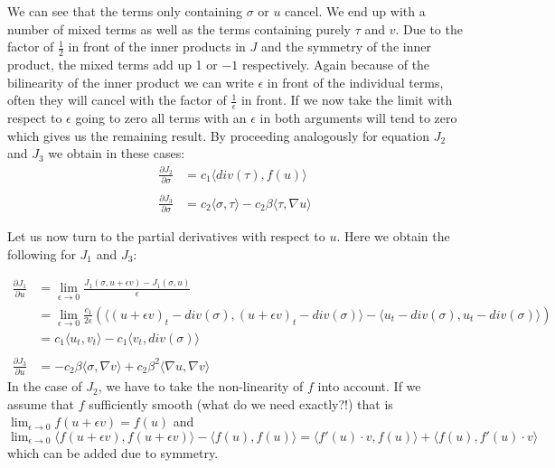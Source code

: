 \documentclass[../draft_1.tex]{subfiles}
\begin{document}
We can see that the terms only containing $\sigma$ or $u$ cancel. We end up with a number of mixed terms as well as the terms containing purely $\tau$ and $v$. Due to the factor of $\frac{1}{2}$ in front of the inner products in $J$ and the symmetry of the inner product, the mixed terms add up 1 or $-1$ respectively. Again because of the bilinearity of the inner product we can write $\epsilon$ in front of the individual terms, often they will cancel with the factor of $\frac{1}{\epsilon}$ in front. If we now take the limit with respect to $\epsilon$ going to zero all terms with an $\epsilon$ in both arguments will tend to zero which gives us the remaining result. By proceeding analogously for equation $J_2$ and $J_3$ we obtain in these cases: 
\begin{equation}
\begin{aligned}
\frac{\partial J_2}{\partial \sigma} &= c_1 \langle div(\tau), f(u) \rangle \\
\\
\frac{\partial J_3}{\partial \sigma} &= c_2 \langle \sigma, \tau \rangle - c_2 \beta \langle \tau, \nabla u \rangle
\end{aligned}
\end{equation}

Let us now turn to the partial derivatives with respect to $u$. Here we obtain the following for $J_1$ and $J_3$:

\begin{equation}
\begin{aligned}
\frac{\partial J_1}{\partial u} &=   \lim_{\epsilon \rightarrow 0} \frac{J_1(\sigma, u + \epsilon v) - J_1(\sigma, u)}{\epsilon}  \\
&= \lim_{\epsilon \rightarrow 0} \frac{c_1}{2 \epsilon} (\langle (u + \epsilon v)_t - div(\sigma), (u + \epsilon v)_t - div(\sigma) \rangle - \langle u_t - div(\sigma), u_t - div(\sigma) \rangle) \\
&= c_1 \langle u_t, v_t \rangle - c_1 \langle v_t, div(\sigma) \rangle \\
\\
\frac{\partial J_3}{\partial u} &= - c_2 \beta \langle \sigma, \nabla v \rangle + c_2 \beta^2 \langle \nabla u, \nabla v \rangle
\end{aligned}
\end{equation}
In the case of $J_2$, we have to take the non-linearity of $f$ into account. If we assume that $f$ sufficiently smooth (what do we need exactly?!) that is $  \lim_{\epsilon \rightarrow 0} f(u + \epsilon v) = f(u) $ and $  \lim_{\epsilon \rightarrow 0} \langle f(u+ \epsilon v), f(u + \epsilon v) \rangle - \langle f(u), f(u) \rangle = \langle f'(u) \cdot v, f(u) \rangle + \langle f(u), f'(u) \cdot v \rangle$ which can be added due to symmetry.
\end{document}
